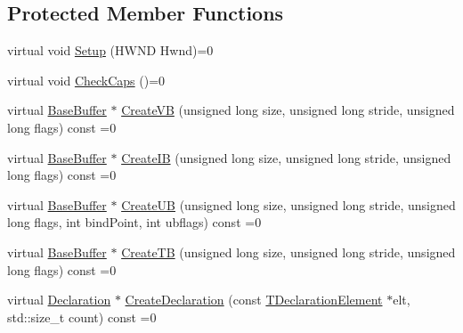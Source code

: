\subsection*{Protected Member Functions}
\begin{DoxyCompactItemize}
\item 
virtual void \hyperlink{class_agmd_1_1_driver_a68e5e8a6292970c5b5af085615d85b44}{Setup} (H\+W\+N\+D Hwnd)=0
\item 
virtual void \hyperlink{class_agmd_1_1_driver_aa8df8afdbd3f33a58d86f8e58d78af46}{Check\+Caps} ()=0
\item 
virtual \hyperlink{class_agmd_1_1_base_buffer}{Base\+Buffer} $\ast$ \hyperlink{class_agmd_1_1_driver_a2bfdc7a75103f9ecfe9c5ee2572a54a1}{Create\+V\+B} (unsigned long size, unsigned long stride, unsigned long flags) const =0
\item 
virtual \hyperlink{class_agmd_1_1_base_buffer}{Base\+Buffer} $\ast$ \hyperlink{class_agmd_1_1_driver_af4c2c44926b8fdc1049fcb4e6876ed0d}{Create\+I\+B} (unsigned long size, unsigned long stride, unsigned long flags) const =0
\item 
virtual \hyperlink{class_agmd_1_1_base_buffer}{Base\+Buffer} $\ast$ \hyperlink{class_agmd_1_1_driver_a4e79ada057eefa151afc9887800f0395}{Create\+U\+B} (unsigned long size, unsigned long stride, unsigned long flags, int bind\+Point, int ubflags) const =0
\item 
virtual \hyperlink{class_agmd_1_1_base_buffer}{Base\+Buffer} $\ast$ \hyperlink{class_agmd_1_1_driver_a1635888b4a66dc7860e1ae7043a319c9}{Create\+T\+B} (unsigned long size, unsigned long stride, unsigned long flags) const =0
\item 
virtual \hyperlink{class_agmd_1_1_declaration}{Declaration} $\ast$ \hyperlink{class_agmd_1_1_driver_a22aa3cceafe772fef0a1a6129ae105b0}{Create\+Declaration} (const \hyperlink{struct_agmd_1_1_t_declaration_element}{T\+Declaration\+Element} $\ast$elt, std\+::size\+\_\+t count) const =0
\end{DoxyCompactItemize}
